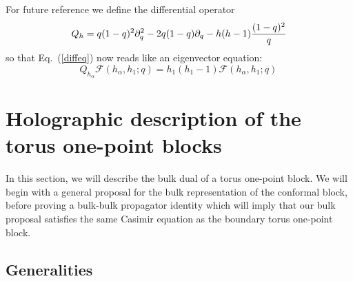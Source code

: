 \documentclass[12pt]{article}
\def\p{\partial}
\begin{document}
For future reference we define the differential operator
%
\begin{equation}\label{Qdef} Q_h = q(1-q)^2\p_q^2 -2q(1-q)\p_q -h(h-1){(1-q)^2\over q}
\end{equation}
%
so that Eq.~(\ref{diffeq}) now reads like an eigenvector equation:
%
\begin{equation}\label{onepointeq} Q_{h_{\alpha}}  \mathcal{F}(h_{\alpha},h_1;q) = h_1(h_1-1)  \mathcal{F}(h_{\alpha},h_1;q)\,
\end{equation}
%


\section{Holographic description of the torus one-point blocks}

In this section, we will describe the bulk dual of a torus one-point block.  We will begin with a general proposal for the bulk representation of the conformal block, before proving a bulk-bulk propagator identity which will imply that our bulk proposal satisfies the same Casimir equation as the boundary torus one-point block.

\subsection{Generalities}
\end{document}
